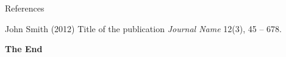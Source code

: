 \documentclass[aspectratio=169,xcolor=dvipsnames,serif]{beamer}
\begin{document}

\begin{frame}{References}
    \footnotesize{
        \begin{thebibliography}{99}
             John Smith (2012)
            \newblock Title of the publication
            \newblock \emph{Journal Name} 12(3), 45 -- 678.
        \end{thebibliography}
    }
\end{frame}


\begin{frame}
    \Huge{\centerline{\textbf{The End}}}
\end{frame}

\end{document}
